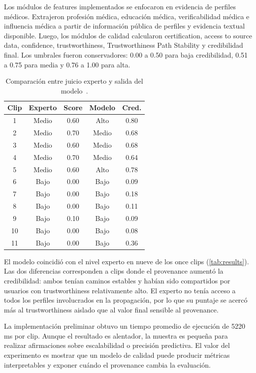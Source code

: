 \documentclass[sigconf, nonacm]{acmart}
\begin{document}
Los m\'odulos de features implementados se enfocaron en evidencia de perfiles
m\'edicos. Extrajeron profesi\'on m\'edica, educaci\'on m\'edica, verificabilidad m\'edica
e influencia m\'edica a partir de informaci\'on p\'ublica de perfiles y evidencia
textual disponible. Luego, los m\'odulos de calidad calcularon certification, access
to source data, confidence, trustworthiness, Trustworthiness Path Stability y
credibilidad final. Los umbrales fueron conservadores: 0.00 a 0.50 para baja
credibilidad, 0.51 a 0.75 para media y 0.76 a 1.00 para alta.

\begin{table}[t]
  \caption{Comparaci\'on entre juicio experto y salida del modelo~\cite{GarciaParra2024Thesis}.}
  \label{tab:results}
  \begin{tabular}{ccccc}
    \toprule
    Clip & Experto & Score & Modelo & Cred.\\
    \midrule
    1 & Medio & 0.60 & Alto & 0.80\\
    2 & Medio & 0.70 & Medio & 0.68\\
    3 & Medio & 0.60 & Medio & 0.68\\
    4 & Medio & 0.70 & Medio & 0.64\\
    5 & Medio & 0.60 & Alto & 0.78\\
    6 & Bajo & 0.00 & Bajo & 0.09\\
    7 & Bajo & 0.00 & Bajo & 0.18\\
    8 & Bajo & 0.00 & Bajo & 0.11\\
    9 & Bajo & 0.10 & Bajo & 0.09\\
    10 & Bajo & 0.00 & Bajo & 0.08\\
    11 & Bajo & 0.00 & Bajo & 0.36\\
    \bottomrule
  \end{tabular}
\end{table}

El modelo coincidi\'o con el nivel experto en nueve de los once clips
(\autoref{tab:results}). Las dos diferencias corresponden a clips donde el
provenance aument\'o la credibilidad: ambos ten\'ian caminos estables y hab\'ian sido
compartidos por usuarios con trustworthiness relativamente alto. El experto no
ten\'ia acceso a todos los perfiles involucrados en la propagaci\'on, por lo que su
puntaje se acerc\'o m\'as al trustworthiness aislado que al valor final sensible al
provenance.

La implementaci\'on preliminar obtuvo un tiempo promedio de ejecuci\'on de 5220 ms
por clip. Aunque el resultado es alentador, la muestra es peque\~na para realizar
afirmaciones sobre escalabilidad o precisi\'on predictiva. El valor del experimento
es mostrar que un modelo de calidad puede producir m\'etricas interpretables y
exponer cu\'ando el provenance cambia la evaluaci\'on.
\end{document}
